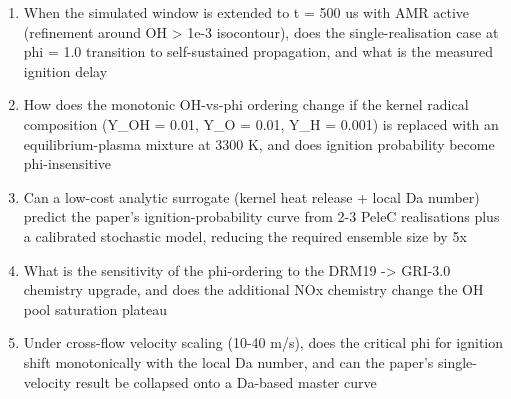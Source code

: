 \documentclass[11pt]{article}
\begin{document}
\begin{enumerate}[leftmargin=1.6em,itemsep=0.2em,topsep=0.2em,label=Q\arabic*.]
\item When the simulated window is extended to t = 500 us with AMR active (refinement around OH \textgreater{} 1e-3 isocontour), does the single-realisation case at phi = 1.0 transition to self-sustained propagation, and what is the measured ignition delay
\item How does the monotonic OH-vs-phi ordering change if the kernel radical composition (Y\_OH = 0.01, Y\_O = 0.01, Y\_H = 0.001) is replaced with an equilibrium-plasma mixture at 3300 K, and does ignition probability become phi-insensitive
\item Can a low-cost analytic surrogate (kernel heat release + local Da number) predict the paper's ignition-probability curve from 2-3 PeleC realisations plus a calibrated stochastic model, reducing the required ensemble size by 5x
\item What is the sensitivity of the phi-ordering to the DRM19 -\textgreater{} GRI-3.0 chemistry upgrade, and does the additional NOx chemistry change the OH pool saturation plateau
\item Under cross-flow velocity scaling (10-40 m/s), does the critical phi for ignition shift monotonically with the local Da number, and can the paper's single-velocity result be collapsed onto a Da-based master curve
\end{enumerate}
\end{document}

